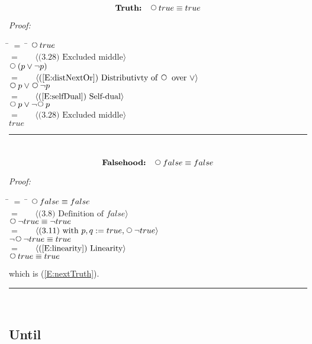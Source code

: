 \documentclass[fleqn, leqno]{article}
\newcommand{\lgap}{2pt}                             %
\newcommand{\mymathindent}{24pt}                    %
\newcommand{\Next}{\;\,\text{\raisebox{3.5pt}{\circle{6}}}}
\newcommand{\myqed}{\hfill\rule[-.23ex]{1.2ex}{2.0ex}}
\newcommand{\Gll} {\langle}                         %
\newcommand{\Ggg} {\rangle}                         %
\newcommand{\Hint}[1]     {\ \ \ $\Gll              \mbox{#1} \Ggg$ }   %
\begin{document}
\begin{equation}\label{E:nextTruth}
\textbf{Truth:}\quad \Next true \equiv true
\end{equation}

\emph{Proof:}
\begin{tabbing}
\hspace{\mymathindent} \= $= \;$ \= \kill
	\> \>   $\Next true$\\[\lgap]
	\> $=$  \>  \Hint{(3.28) Excluded middle}\\[\lgap]
	\> \>   $\Next(p \lor \lnot p)$\\[\lgap]
	\> $=$  \>  \Hint{(\ref{E:distNextOr}) Distributivty of $\Next$ over $\lor$}\\[\lgap]
	\> \>   $\Next p \lor \Next\lnot p$\\[\lgap]
	\> $=$  \>  \Hint{(\ref{E:selfDual}) Self-dual}\\[\lgap]
	\> \>   $\Next p \lor \lnot\Next p$\\[\lgap]
	\> $=$  \>  \Hint{(3.28) Excluded middle}\\[\lgap]
	\> \>   $true$\\[\lgap]
\end{tabbing}
\myqed\\[\lgap]


\begin{equation}\label{E:nextFalse}
\textbf{Falsehood:}\quad \Next false \equiv false
\end{equation}

\emph{Proof:}
\begin{tabbing}
\hspace{\mymathindent} \= $= \;$ \= \kill
  \> \>   $\Next false \equiv false$\\[\lgap]
  \> $=$  \>  \Hint{(3.8) Definition of $false$} \\[\lgap]
  \> \>   $\Next\lnot true \equiv \lnot true$\\[\lgap]
  \> $=$  \>  \Hint{(3.11) with $p,q := true, \Next\lnot true$}\\[\lgap]
  \> \>   $\lnot\Next\lnot true \equiv true$\\[\lgap]
  \> $=$  \>  \Hint{(\ref{E:linearity}) Linearity}\\[\lgap]
  \> \>   $\Next true \equiv true$\\[\lgap]
\end{tabbing}
which is (\ref{E:nextTruth}). \myqed\\[\lgap]

\subsection{Until}
\end{document}
